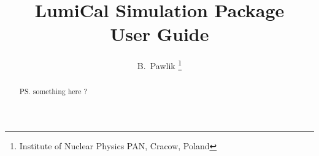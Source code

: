 

\subject{\texttt{[image: img/lumical]}}


\title{\Huge{\bfseries{LumiCal Simulation Package \\ User Guide}}} 

\author{\normalsize {B.~Pawlik \thanks{Institute of Nuclear Physics PAN, Cracow, Poland}}}



\maketitle \thispagestyle{empty}

\vspace{-30pt}
\begin{abstract}

\noindent \ps{something here ?}

\end{abstract}


